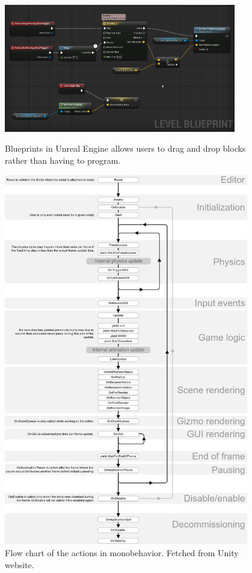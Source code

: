 \begin{figure}[H] 
    \centering
    \includegraphics[width=0.9\textwidth]{OtherImages/UEBlueprint.png}
    \caption[BluePrints in Unreal Engine]{Blueprints in Unreal Engine allows users to drag and drop blocks rather than having to program.}
        \label{UnrealEngineBlueprint}
\end{figure}
\newpage
\begin{figure}[H]
    \centering
    \includegraphics[width=0.95\textwidth]{03_Background/Appendix/Images/monobehaviour_flowchart.png}
    \caption[Monobehavior flow chart]{Flow chart of the actions in monobehavior. Fetched from Unity website.}
    \label{A:MonobehaviorFlow}
\end{figure}